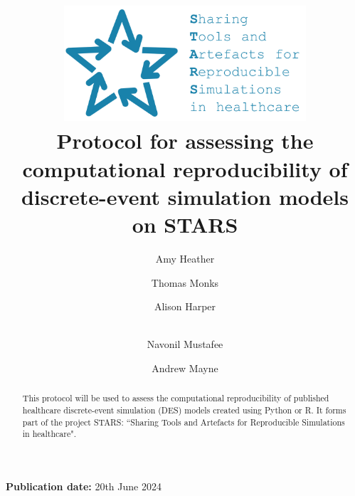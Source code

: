 \title{
    \vspace{-1.2cm}
    \includegraphics[width=9cm]{images/stars_logo_blue_text.png}\\[1cm]
    \textbf{Protocol for assessing the computational reproducibility of discrete-event simulation models on STARS}
}

\author[1]{ Amy Heather}
\author[1]{ Thomas Monks}
\author[2]{ Alison Harper}
\author[2]{\\  Navonil Mustafee}
\author[3]{ Andrew Mayne}


\date{}

\maketitle

\textbf{Publication date:} 20th June 2024

\vspace{0.5cm}

\begin{shaded}
    \begin{abstract}
        This protocol will be used to assess the computational reproducibility of published healthcare discrete-event simulation (DES) models created using Python or R. It forms part of the project STARS: ``Sharing Tools and Artefacts for Reproducible Simulations in healthcare".
    \end{abstract}
\end{shaded}

